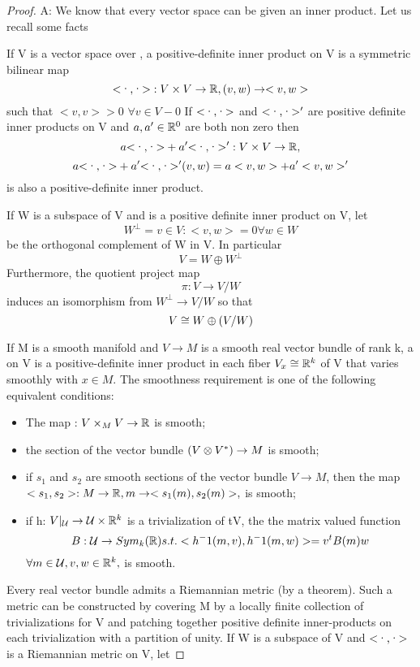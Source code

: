 \begin{proof}
A: We know that every vector space can be given an inner product. Let us recall some facts
\begin{recall}
 If V is a vector space over \Rbb, a positive-definite inner product on V is a symmetric bilinear map
$$\scal: V \times V \to \Rbb, (v,w) \to <v,w>$$
such that $<v,v>\gt 0$ $\forall v\in V - 0$
If $\scal$ and $\scal '$ are positive definite inner products on V and $a,a' \in \mathbb{R}^{0}$ are both non zero then
$$a \scal + a'\scal ': V \times V \to \Rbb,$$ $$ {a\scal +a'\scal'(v,w) = a <v,w> +a'<v,w>'}$$
is also a positive-definite inner product.
   
\end{recall}
   If W is a subspace of V and \scal is a positive definite inner product on V, let 
\begin{equation*}
 W^{\perp} = {v \in V: <v,w> = 0 \forall w \in W}
\end{equation*}
be the orthogonal complement of W in V. In particular 
\begin{equation*}
 V = W \oplus W^{\perp}
\end{equation*}
Furthermore, the quotient project map 
\begin{equation*}
 \pi: V \to V/W
\end{equation*}
induces an isomorphism from $W^\perp \to V/W$ so that 
\begin{equation*}
 V \cong W \oplus (V/W)
\end{equation*}

If M is a smooth manifold and $V \to M$ is a smooth real vector bundle of rank k, a  on V is a 
positive-definite inner product in each fiber 
$V_x \cong \mathbb{R}^k$ of V that varies smoothly with $x \in M$.
    The smoothness requirement is one of the following equivalent conditions:
\begin{itemize}
 \item The map \scal: $V \times_{M} V \to \mathbb{R}$ is smooth;
\item the section \scal of the vector bundle $(V \otimes V^{*})\to M$ is smooth;
\item if $s_1$ and $s_2$ are smooth sections of the vector bundle $V \to M$, then the map
$<s_1,s_2>:M \to \mathbb{R}, m \to <s_1(m),s_2(m)>,$ is smooth;
\item if h: $V|_{\mathcal{U}}\to \mathcal{U} \times \mathbb{R}^k$ is a trivialization of tV, the the matrix valued function
\begin{equation*}
 B: \mathcal{U} \to Sym_{k}(\mathbb{R}) s.t. <h^-1(m,v),h^-1(m,w)> = v^t B(m) w 
\end{equation*}
$\forall m \in \mathcal{U}, v,w \in \mathbb{R}^k,$ is smooth.
\end{itemize}
Every real vector bundle admits a Riemannian metric (by a theorem). Such a metric can be constructed by covering M by a locally
finite collection of trivializations for V and patching together positive definite inner-products on each trivialization 
with a partition of unity. If W is a subspace of V and $\scal$ is a Riemannian metric on V, let


\end{proof}
